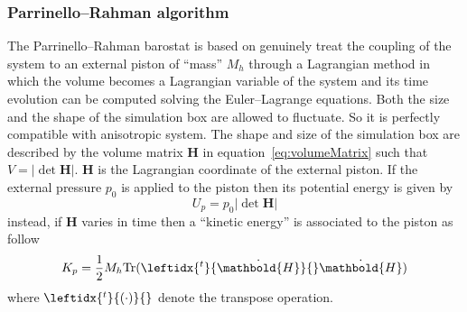 \subsubsection{Parrinello--Rahman algorithm}
The Parrinello--Rahman barostat \cite{ParrinelloBarostat1}\cite{ParrinelloBarostat2} is based on genuinely treat
the coupling of the system to an external piston of ``mass'' $M_h$ through a Lagrangian method in which the
volume becomes a Lagrangian variable of the system and its time evolution can be computed solving the
Euler--Lagrange equations. Both the size and the shape of the simulation box are allowed to fluctuate. So it is
perfectly compatible with anisotropic system. The shape and size of the simulation box are described by the
volume matrix $ \mathbold{H}$ in equation~\eqref{eq:volumeMatrix} such that $V = |\det\mathbold{H}|$.
$\mathbold{H}$ is the Lagrangian coordinate of the external piston. If the external pressure $p_0$ is applied to
the piston then its potential energy is given by
\begin{equation*}
	U_p = p_0 |\det  \mathbold{H}|
\end{equation*}
instead, if $ \mathbold{H}$ varies in time then a ``kinetic energy'' is associated to the piston as follow
\begin{equation*}
	K_p = \frac{1}{2}M_h \text{Tr}(\leftidx{^t}{\dot{ \mathbold{H}}}{} \dot{ \mathbold{H}} )
\end{equation*}
where $\leftidx{^t}{(\cdot)}{}$ denote the transpose operation.

